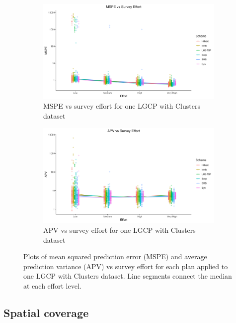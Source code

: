 \documentclass[review]{elsarticle}
\begin{document}
\begin{figure}

\begin{subfigure}{5in}
\includegraphics[width=5in]{../graphics/MSPE-effort-notpaneled-Cluster000004.png}
\caption{MSPE vs survey effort for one LGCP with Clusters dataset}
\label{mspeclust}
\end{subfigure}

\begin{subfigure}{5in}
\includegraphics[width=5in]{../graphics/APV-effort-notpaneled-Cluster000004.png}
\caption{APV vs survey effort for one LGCP with Clusters dataset}
\label{apvclust}
\end{subfigure}

\caption{Plots of mean squared prediction error (MSPE) and average prediction
variance (APV) vs survey effort for each plan applied to one LGCP with Clusters
dataset. Line segments connect the median at each effort level.}
\label{clustresults}
\end{figure}


\subsection{Spatial coverage}
\end{document}
